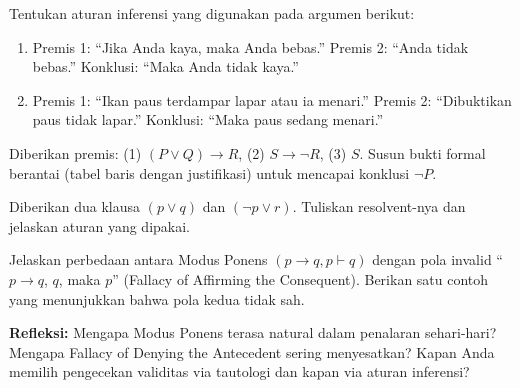 \documentclass[../main]{subfiles}
\begin{document}

\begin{latihan}
  \item Tentukan aturan inferensi yang digunakan pada argumen berikut:
  \begin{enumerate}
    \item Premis 1: ``Jika Anda kaya, maka Anda bebas.'' Premis 2: ``Anda tidak bebas.'' Konklusi: ``Maka Anda tidak kaya.''
    \item Premis 1: ``Ikan paus terdampar lapar atau ia menari.'' Premis 2: ``Dibuktikan paus tidak lapar.'' Konklusi: ``Maka paus sedang menari.''
  \end{enumerate}
  \item Diberikan premis: (1) $(P \vee Q) \rightarrow R$, (2) $S \rightarrow \neg R$, (3) $S$. Susun bukti formal berantai (tabel baris dengan justifikasi) untuk mencapai konklusi $\neg P$.
  \item Diberikan dua klausa $(p \vee q)$ dan $(\neg p \vee r)$. Tuliskan resolvent-nya dan jelaskan aturan yang dipakai.
  \item Jelaskan perbedaan antara Modus Ponens $(p \rightarrow q, p \vdash q)$ dengan pola invalid ``$p \rightarrow q$, $q$, maka $p$'' (Fallacy of Affirming the Consequent). Berikan satu contoh yang menunjukkan bahwa pola kedua tidak sah.
  \item \textbf{Refleksi:} Mengapa Modus Ponens terasa natural dalam penalaran sehari-hari? Mengapa Fallacy of Denying the Antecedent sering menyesatkan? Kapan Anda memilih pengecekan validitas via tautologi dan kapan via aturan inferensi?
\end{latihan}

\end{document}
